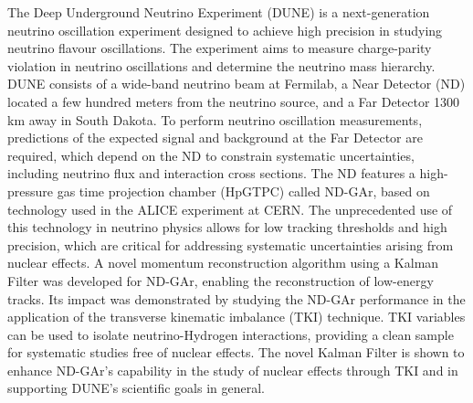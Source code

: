 
The Deep Underground Neutrino Experiment (DUNE) is a next-generation neutrino oscillation experiment designed to achieve high precision in studying neutrino flavour oscillations. The experiment aims to measure charge-parity violation in neutrino oscillations and determine the neutrino mass hierarchy. DUNE consists of a wide-band neutrino beam at Fermilab, a Near Detector (ND) located a few hundred meters from the neutrino source, and a Far Detector 1300 km away in South Dakota. To perform neutrino oscillation measurements, predictions of the expected signal and background at the Far Detector are required, which depend on the ND to constrain systematic uncertainties, including neutrino flux and interaction cross sections. The ND features a high-pressure gas time projection chamber (HpGTPC) called ND-GAr, based on technology used in the ALICE experiment at CERN. The unprecedented use of this technology in neutrino physics allows for low tracking thresholds and high precision, which are critical for addressing systematic uncertainties arising from nuclear effects. A novel momentum reconstruction algorithm using a Kalman Filter was developed for ND-GAr, enabling the reconstruction of low-energy tracks. Its impact was demonstrated by studying the ND-GAr performance in the application of the transverse kinematic imbalance (TKI) technique. TKI variables can be used to isolate neutrino-Hydrogen interactions, providing a clean sample for systematic studies free of nuclear effects. The novel Kalman Filter is shown to enhance ND-GAr’s capability in the study of nuclear effects through TKI and in supporting DUNE’s scientific goals in general.
